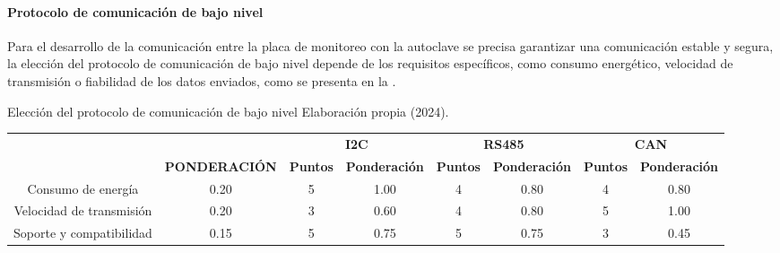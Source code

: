 \paragraph{Protocolo de comunicación de bajo nivel}
Para el desarrollo de la comunicación entre la placa de monitoreo con la autoclave se precisa garantizar una comunicación estable y segura, la elección del protocolo de comunicación de bajo nivel depende de los requisitos específicos, como consumo energético, velocidad de transmisión o fiabilidad de los datos enviados, como se presenta en la .
\begin{tabla}[bajo]  
{Elección del protocolo de comunicación de bajo nivel}
{Elaboración propia (2024).}
\centering
\resizebox{15cm}{!}
{
\begin{tabular}{|c|c|c|c|c|c|c|c|} 
\hline
\rowcolor[rgb]{0.678,0.702,0.698} {\cellcolor[rgb]{0.678,0.702,0.698}}                                    & {\cellcolor[rgb]{0.678,0.702,0.698}}                                       & \multicolumn{2}{c|}{\textbf{I2C}}      & \multicolumn{2}{c|}{\textbf{RS485}}    & \multicolumn{2}{c|}{\textbf{CAN}}       \\
\rowcolor[rgb]{0.678,0.702,0.698} \multirow{-2}{*}{{\cellcolor[rgb]{0.678,0.702,0.698}}\textbf{CRITERIO}} & \multirow{-2}{*}{{\cellcolor[rgb]{0.678,0.702,0.698}}\textbf{PONDERACIÓN}} & \textbf{Puntos} & \textbf{Ponderación} & \textbf{Puntos} & \textbf{Ponderación} & \textbf{Puntos} & \textbf{Ponderación}  \\ 
\hline
\rowcolor[rgb]{0.027,0.894,0.675} Consumo de energía                                                      & 0.20                                                                       & 5               & 1.00                 & 4               & 0.80                 & 4               & 0.80                  \\ 
\hline
\rowcolor[rgb]{0.027,0.894,0.675} Velocidad de transmisión                                                & 0.20                                                                       & 3               & 0.60                 & 4               & 0.80                 & 5               & 1.00                  \\ 
\hline
Soporte y compatibilidad                                                                                  & 0.15                                                                       & 5               & 0.75                 & 5               & 0.75                 & 3               & 0.45                  \\ 

\end{tabular}}
\end{tabla}
